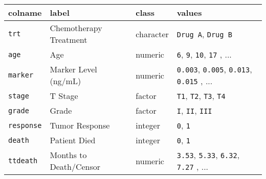 \captionsetup[table]{labelformat=empty,skip=1pt}
\begin{longtable}{llll}
\toprule
colname & label & class & values \\ 
\midrule
\texttt{\textquotedbl{}trt\textquotedbl{}} & Chemotherapy Treatment & character & \texttt{Drug A}, \texttt{Drug B} \\ 
\texttt{\textquotedbl{}age\textquotedbl{}} & Age & numeric & \texttt{6}, \texttt{9}, \texttt{10}, \texttt{17} , ... \\ 
\texttt{\textquotedbl{}marker\textquotedbl{}} & Marker Level (ng/mL) & numeric & \texttt{0.003}, \texttt{0.005}, \texttt{0.013}, \texttt{0.015} , ... \\ 
\texttt{\textquotedbl{}stage\textquotedbl{}} & T Stage & factor & \texttt{T1}, \texttt{T2}, \texttt{T3}, \texttt{T4} \\ 
\texttt{\textquotedbl{}grade\textquotedbl{}} & Grade & factor & \texttt{I}, \texttt{II}, \texttt{III} \\ 
\texttt{\textquotedbl{}response\textquotedbl{}} & Tumor Response & integer & \texttt{0}, \texttt{1} \\ 
\texttt{\textquotedbl{}death\textquotedbl{}} & Patient Died & integer & \texttt{0}, \texttt{1} \\ 
\texttt{\textquotedbl{}ttdeath\textquotedbl{}} & Months to Death/Censor & numeric & \texttt{3.53}, \texttt{5.33}, \texttt{6.32}, \texttt{7.27} , ... \\ 
\bottomrule
\end{longtable}

